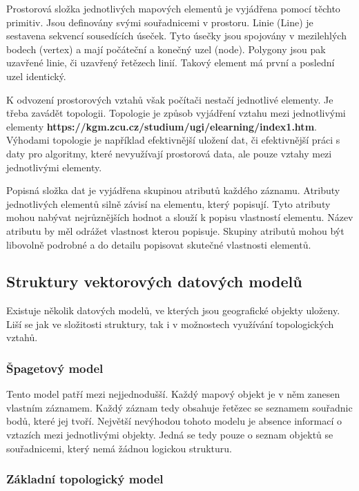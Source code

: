 Prostorová složka jednotlivých mapových elementů je vyjádřena pomocí těchto primitiv. Jsou definovány svými souřadnicemi v prostoru. Linie (Line) je sestavena sekvencí sousedících úseček. Tyto úsečky jsou spojovány v mezilehlých bodech (vertex) a mají počáteční a konečný uzel (node). Polygony jsou pak uzavřené linie, či uzavřený řetězech linií. Takový element má první a poslední uzel identický. 

K odvození prostorových vztahů však počítači nestačí jednotlivé elementy. Je třeba zavádět topologii. Topologie je způsob vyjádření vztahu mezi jednotlivými elementy \textbf{https://kgm.zcu.cz/studium/ugi/elearning/index1.htm}. Výhodami topologie je například efektivnější uložení dat, či efektivnější práci s daty pro algoritmy, které nevyužívají prostorová data, ale pouze vztahy mezi jednotlivými elementy. 

Popisná složka dat je vyjádřena skupinou atributů každého záznamu. Atributy jednotlivých elementů silně závisí na elementu, který popisují. Tyto atributy mohou nabývat nejrůznějších hodnot a slouží k popisu vlastností elementu. Název atributu by měl odrážet vlastnost kterou popisuje. Skupiny atributů mohou být libovolně podrobné a do detailu popisovat skutečné vlastnosti elementů. 

\subsection{Struktury vektorových datových modelů}
\label{subsection:struktury_vektorovych_modelu}

Existuje několik datových modelů, ve kterých jsou geografické objekty uloženy. Liší se jak ve složitosti struktury, tak i v možnostech využívání topologických vztahů.

\subsubsection{Špagetový model}
\label{subsubsection:spagetovy_model}

Tento model patří mezi nejjednodušší. Každý mapový objekt je v něm zanesen vlastním záznamem. Každý záznam tedy obsahuje řetězec se seznamem souřadnic bodů, které jej tvoří. Největší nevýhodou tohoto modelu je absence informací o vztazích mezi jednotlivými objekty. Jedná se tedy pouze o seznam objektů se souřadnicemi, který nemá žádnou logickou strukturu.

\subsubsection{Základní topologický model}
\label{subsubsection:zakladni_topologicky_model}

